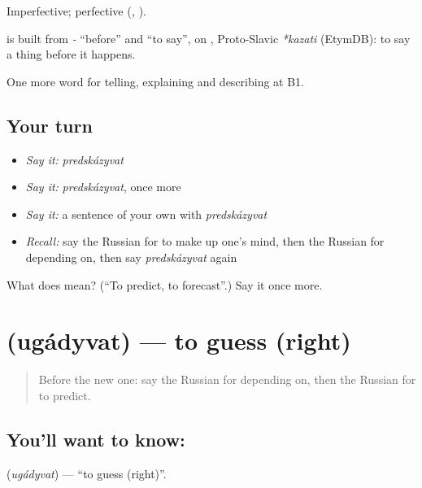 Imperfective; perfective \emph{} (\emph{, }).

\begin{cousinweb}
\textbf{} is built from \emph{-} \textquotedblleft{}before\textquotedblright{} and \emph{} \textquotedblleft{}to say\textquotedblright{}, on \emph{}, Proto-Slavic \emph{*kazati} (EtymDB): to say a thing before it happens.
\end{cousinweb}

\begin{grammarlens}[title={What you've built}]
One more word for telling, explaining and describing at B1.
\end{grammarlens}

\subsection*{Your turn}
\begin{itemize}
\raggedright
  \item \emph{Say it:} \emph{predskázyvat}
  \item \emph{Say it:} \emph{predskázyvat}, once more
  \item \emph{Say it:} a sentence of your own with \emph{predskázyvat}
  \item \emph{Recall:} say the Russian for to make up one’s mind, then the Russian for depending on, then say \emph{predskázyvat} again
\end{itemize}

\begin{tcolorbox}[breakable,colback=teal!4,colframe=teal!35!black,title={Before you move on}]
What does  mean? (\textquotedblleft{}To predict, to forecast\textquotedblright{}.) Say it once more.
\end{tcolorbox}
\section[\texorpdfstring{\ru{угадывать} (ugádyvat)}{угадывать (ugádyvat)}]{ (ugádyvat) — to guess (right)}

\label{lesson:RU-C380-ugadyvat}



\begin{quote}
Before the new one: say the Russian for depending on, then the Russian for to predict.
\end{quote}

\subsection*{You'll want to know: }
\textbf{} (\emph{ugádyvat}) — \textquotedblleft{}to guess (right)\textquotedblright{}.

